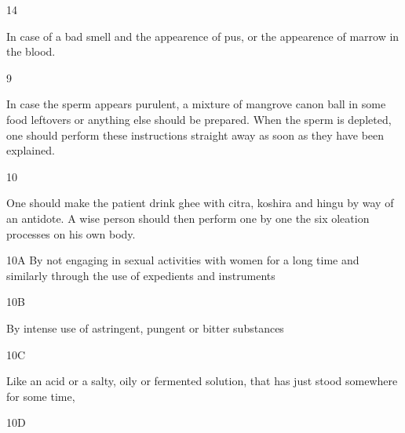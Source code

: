 \begin{translation}
\item[14]

In case of a bad smell and the appearence of pus, or the appearence of marrow 
in the blood. 



 
 
  \begin{tt}
     \bigskip
     \raggedright
 
% 
% 
% 
 
 \item[9]
 
  In case the sperm appears purulent, a mixture of mangrove canon ball in some 
  food leftovers or anything else should be prepared. When the sperm is 
  depleted, one should perform these instructions straight away as soon as they 
  have been explained.
 
 \item[10]
 
  One should make the patient drink ghee with citra, koshira and hingu by way of 
  an antidote. A wise person should then perform one by one the six oleation 
  processes on his own body.
  
  
  
\item[10A]  By not engaging in sexual activities with women for a long time and 
similarly 
  through the use of expedients and instruments
  
\item[10B]

By intense use of astringent, pungent or bitter substances
  
\item[10C]

Like an acid or a salty, oily or fermented solution, that has just stood 
  somewhere for some time,
  
\item[10D]


\end{tt}
\end{translation}
